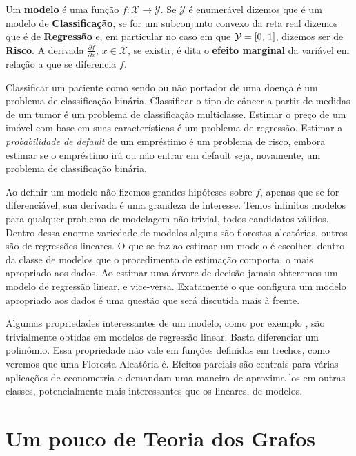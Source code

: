 \begin{defi}[Modelos]
Um \textbf{modelo} é uma função $f: \mathcal{X} \to \mathcal{Y}$. Se $\mathcal{Y}$ é enumerável dizemos que é um modelo de \textbf{Classificação}, se for um subconjunto convexo da reta real dizemos que é de \textbf{Regressão} e, em particular no caso em que $\mathcal{Y} = [0, \,1]$, dizemos ser de \textbf{Risco}. A derivada $\frac{\partial f}{\partial x}, \, x \in \mathcal{X}$, se existir, é dita o \textbf{efeito marginal} da variável em relação a que se diferencia $f$.
\end{defi} 

Classificar um paciente como sendo ou não portador de uma doença é  um problema de classificação binária. Classificar o tipo de câncer a partir de medidas de um tumor é um problema de classificação multiclasse. Estimar o preço de um imóvel com base em suas características é um problema de regressão. Estimar a \textit{probabilidade de default}  de um empréstimo é um problema de risco, embora estimar se o empréstimo irá ou não entrar em default seja, novamente, um problema de classificação binária. 

Ao definir um modelo não fizemos grandes hipóteses sobre $f$, apenas que se for diferenciável, sua derivada é uma grandeza de interesse. Temos infinitos modelos para qualquer problema de modelagem não-trivial, todos candidatos válidos. Dentro dessa enorme variedade de modelos alguns são florestas aleatórias, outros são de regressões lineares. O que se faz ao estimar um modelo é escolher, dentro da classe de modelos que o procedimento de estimação comporta, o mais apropriado aos dados. Ao estimar uma árvore de decisão jamais obteremos um modelo de regressão linear, e vice-versa. Exatamente o que configura um modelo apropriado aos dados é uma questão que será discutida mais à frente.

Algumas propriedades interessantes de um modelo, como por exemplo , são trivialmente obtidas em modelos de regressão linear. Basta diferenciar um polinômio. Essa propriedade não vale em funções definidas em trechos, como veremos que uma Floresta Aleatória é. Efeitos parciais são centrais para várias aplicações de econometria e demandam uma maneira de aproxima-los em outras classes, potencialmente mais interessantes que os lineares, de modelos. 

\section{Um pouco de Teoria dos Grafos}

